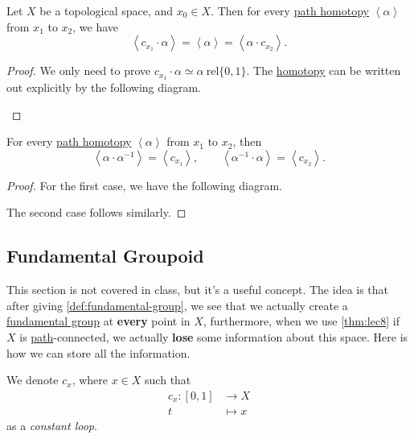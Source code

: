 \begin{lemma}\label{lma:lec8-3}
	Let \(X\) be a topological space, and \(x_0\in X\). Then for every \hyperref[def:homotopy-path]{path homotopy} \(\left< \alpha  \right> \) from
	\(x_1\) to \(x_2\), we have
	\[
		\left< c_{x_1}\cdot \alpha  \right> = \left< \alpha  \right> = \left< \alpha \cdot c_{x_2} \right>.
	\]
\end{lemma}
\begin{proof}
	We only need to prove \(c_{x_1}\cdot \alpha \simeq \alpha\ \mathrm{rel} \{0,1\} \). The \hyperref[def:homotopy]{homotopy} can be written out explicitly by the following diagram.
	\begin{figure}[H]
		\centering
		\label{fig:pf:lma:lec8-3}
	\end{figure}
\end{proof}

\begin{lemma}\label{lma:lec8-4}
	For every \hyperref[def:homotopy-path]{path homotopy} \(\left< \alpha  \right> \) from \(x_1\) to \(x_2\), then
	\[
		\left< \alpha \cdot \alpha ^{-1}  \right> = \left< c_{x_1} \right>, \qquad \left< \alpha ^{-1} \cdot \alpha  \right> = \left< c_{x_2} \right>.
	\]
\end{lemma}
\begin{proof}
	For the first case, we have the following diagram.
	\begin{figure}[H]
		\centering
		\label{fig:pf:lma:lec8-4}
	\end{figure}
	The second case follows similarly.
\end{proof}

\subsection{Fundamental Groupoid}
This section is not covered in class, but it's a useful concept. The idea is that after giving \autoref{def:fundamental-group}, we see that we actually create a \hyperref[def:fundamental-group]{fundamental group}
at \textbf{every} point in \(X\), furthermore, when we use \autoref{thm:lec8} if \(X\) is \hyperref[def:path]{path}-connected, we actually \textbf{lose} some
information about this space. Here is how we can store all the information.

\begin{notation}\label{not:constant-loop}
	We denote \(c_x\), where \(x\in X\) such that
	\[
		\begin{split}
			c_{x}\colon [0, 1]&\to X\\
			t&\mapsto x
		\end{split}
	\]
	as a \emph{constant loop}.
\end{notation}

